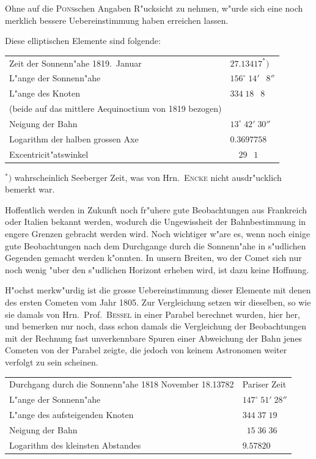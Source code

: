 \documentclass[12pt,a4paper]{article}
\begin{document}
Ohne auf die \textsc{Pons}schen Angaben R"ucksicht zu nehmen, w"urde sich eine noch merklich bessere
Uebereinstimmung haben erreichen lassen.

Diese elliptischen Elemente sind folgende:

\begin{center}
\begin{tabular}{l@{\dotfill}l}
Zeit der Sonnenn"ahe 1819.~Januar & $27.13417^{*})$ \\
L"ange der Sonnenn"ahe & $156^{\circ}\;14'\;\phantom{0}8''$ \\
L"ange des Knoten & $334\;18\;\phantom{0}8$ \\
(beide auf das mittlere Aequinoctium von 1819 bezogen) & \\
Neigung der Bahn & $13^{\circ}\;42'\;30''$ \\
Logarithm der halben grossen Axe & $0.3697758$ \\
Excentricit"atswinkel & $\phantom{0}\phantom{0}29\;\phantom{0}1\;\phantom{0}\phantom{0}\phantom{0}$ \\
\end{tabular}
\end{center}

$^{*})$ wahrscheinlich Seeberger Zeit, was von Hrn.~\textsc{Encke} nicht ausdr"ucklich bemerkt war.

Hoffentlich werden in Zukunft noch fr"uhere gute Beobachtungen aus Frankreich oder Italien bekannt
werden, wodurch die Ungewissheit der Bahnbestimmung in engere Grenzen gebracht werden wird.
Noch wichtiger w"are es, wenn noch einige gute Beobachtungen nach dem Durchgange durch die Sonnenn"ahe
in s"udlichen Gegenden gemacht werden k"onnten. In unsern Breiten, wo der Comet sich nur noch
wenig "uber den s"udlichen Horizont erheben wird, ist dazu keine Hoffnung.

H"ochst merkw"urdig ist die grosse Uebereinstimmung dieser Elemente mit denen des ersten Cometen
vom Jahr 1805. Zur Vergleichung setzen wir dieselben, so wie sie damals von Hrn.~Prof.~\textsc{Bessel}
in einer Parabel berechnet wurden, hier her, und bemerken nur noch, dass schon damals die Vergleichung
der Beobachtungen mit der Rechnung fast unverkennbare Spuren einer Abweichung der Bahn jenes Cometen
von der Parabel zeigte, die jedoch von keinem Astronomen weiter verfolgt zu sein scheinen.

\begin{center}
\begin{tabular}{l@{\dotfill}l}
Durchgang durch die Sonnenn"ahe 1818 November 18.13782 & Pariser Zeit \\
L"ange der Sonnenn"ahe & $147^{\circ}\;51'\;28''$ \\
L"ange des aufsteigenden Knoten & $344\;37\;19$ \\
Neigung der Bahn & $\phantom{0}15\;36\;36$ \\
Logarithm des kleinsten Abstandes & $9.57820$ \\
\end{tabular}
\end{center}
\end{document}
